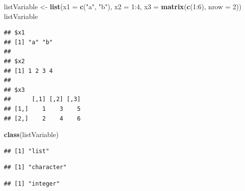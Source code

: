 \documentclass[]{book}
\newenvironment{Shaded}{\begin{snugshade}}{\end{snugshade}}
\newcommand{\KeywordTok}[1]{\textcolor[rgb]{0.12,0.11,0.11}{\textbf{#1}}}
\newcommand{\DataTypeTok}[1]{\textcolor[rgb]{0.00,0.34,0.68}{#1}}
\newcommand{\DecValTok}[1]{\textcolor[rgb]{0.69,0.50,0.00}{#1}}
\newcommand{\StringTok}[1]{\textcolor[rgb]{0.75,0.01,0.01}{#1}}
\newcommand{\OperatorTok}[1]{\textcolor[rgb]{0.12,0.11,0.11}{#1}}
\newcommand{\NormalTok}[1]{\textcolor[rgb]{0.12,0.11,0.11}{#1}}
\theoremstyle{definition}
\theoremstyle{definition}
\theoremstyle{definition}
\theoremstyle{remark}
\begin{document}
\begin{Shaded}
\begin{Highlighting}[]
\NormalTok{listVariable <-}\StringTok{ }\KeywordTok{list}\NormalTok{(}\DataTypeTok{x1 =} \KeywordTok{c}\NormalTok{(}\StringTok{"a"}\NormalTok{, }\StringTok{"b"}\NormalTok{), }\DataTypeTok{x2 =} \DecValTok{1}\OperatorTok{:}\DecValTok{4}\NormalTok{, }\DataTypeTok{x3 =} \KeywordTok{matrix}\NormalTok{(}\KeywordTok{c}\NormalTok{(}\DecValTok{1}\OperatorTok{:}\DecValTok{6}\NormalTok{), }\DataTypeTok{nrow =} \DecValTok{2}\NormalTok{))}
\NormalTok{listVariable}
\end{Highlighting}
\end{Shaded}

\begin{verbatim}
## $x1
## [1] "a" "b"
## 
## $x2
## [1] 1 2 3 4
## 
## $x3
##      [,1] [,2] [,3]
## [1,]    1    3    5
## [2,]    2    4    6
\end{verbatim}

\begin{Shaded}
\begin{Highlighting}[]
\KeywordTok{class}\NormalTok{(listVariable)}
\end{Highlighting}
\end{Shaded}

\begin{verbatim}
## [1] "list"
\end{verbatim}

\begin{Shaded}
\end{Shaded}

\begin{verbatim}
## [1] "character"
\end{verbatim}

\begin{Shaded}
\end{Shaded}

\begin{verbatim}
## [1] "integer"
\end{verbatim}

\begin{Shaded}
\end{Shaded}
\end{document}
